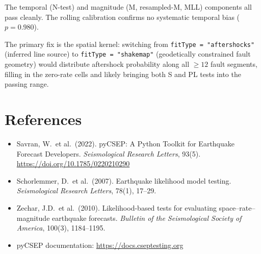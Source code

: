 \documentclass[12pt,a4paper]{article}
\begin{document}
The temporal (N-test) and magnitude (M, resampled-M, MLL) components all
pass cleanly. The rolling calibration confirms no systematic temporal bias
($p = 0.980$).

The primary fix is the spatial kernel: switching from
\texttt{fitType = "aftershocks"} (inferred line source) to
\texttt{fitType = "shakemap"} (geodetically constrained fault geometry) would
distribute aftershock probability along all $\geq 12$ fault segments, filling
in the zero-rate cells and likely bringing both S and PL tests into the
passing range.

\section*{References}
\begin{itemize}
    \item Savran, W.\ et al.\ (2022). pyCSEP: A Python Toolkit for Earthquake
          Forecast Developers. \textit{Seismological Research Letters}, 93(5).
          \url{https://doi.org/10.1785/0220210290}
    \item Schorlemmer, D.\ et al.\ (2007). Earthquake likelihood model testing.
          \textit{Seismological Research Letters}, 78(1), 17--29.
    \item Zechar, J.D.\ et al.\ (2010). Likelihood-based tests for evaluating
          space--rate--magnitude earthquake forecasts.
          \textit{Bulletin of the Seismological Society of America}, 100(3),
          1184--1195.
    \item pyCSEP documentation: \url{https://docs.cseptesting.org}
\end{itemize}
\end{document}
